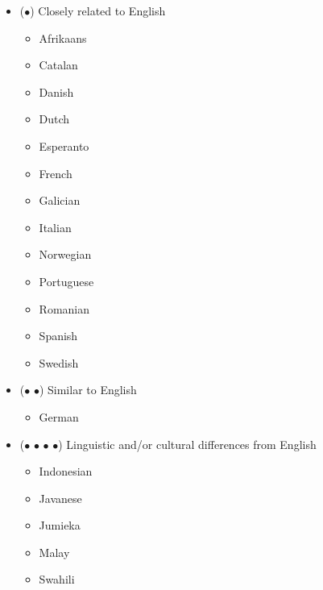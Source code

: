 \documentclass["../Misguided by Starlight.tex"]{subfiles}
\begin{document}
	\begin{itemize}
		\item ($\bullet$) Closely related to English
		\begin{itemize}
			\item Afrikaans
			\item Catalan
			\item Danish
			\item Dutch
			\item Esperanto
			\item French
			\item Galician
			\item Italian
			\item Norwegian
			\item Portuguese
			\item Romanian
			\item Spanish
			\item Swedish
		\end{itemize}
			
		\item ($\bullet$ $\bullet$) Similar to English
		\begin{itemize}
			\item German
		\end{itemize}

		\item ($\bullet$ $\bullet$ $\bullet$ $\bullet$) Linguistic and/or cultural differences from English
		\begin{itemize}
			\item Indonesian
			\item Javanese
			\item Jumieka
			\item Malay
			\item Swahili
		\end{itemize}
	 

\end{itemize}
\end{document}
